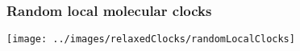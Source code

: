 \begin{frame}
\frametitle{Random local molecular clocks}

\texttt{[image: ../images/relaxedClocks/randomLocalClocks]}

\end{frame}